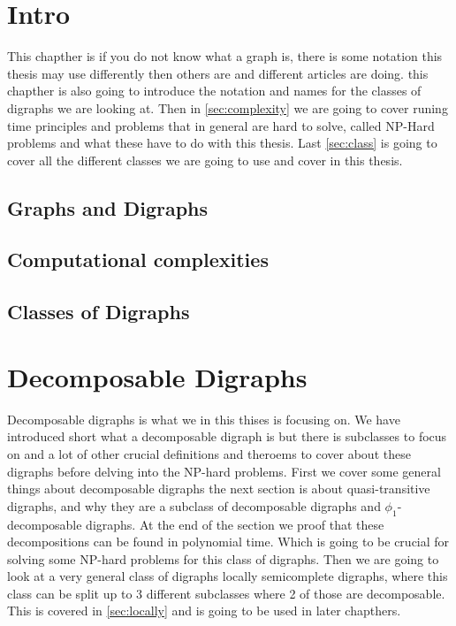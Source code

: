 
\chapter{Intro}
This chapther is if you do not know what a graph is, there is some notation this thesis may use differently then others are and different articles are doing. this chapther is also going to introduce the notation and names for the classes of digraphs we are looking at. Then in \autoref{sec:complexity} we are going to cover runing time principles and problems that in general are hard to solve, called NP-Hard problems and what these have to do with this thesis. Last \autoref{sec:class} is going to cover all the different classes we are going to use and cover in this thesis.
\label{chap:intro}
\section{Graphs and Digraphs}
\label{sec:digraph}

\section{Computational complexities}
\label{sec:complexity}
%
\section{Classes of Digraphs}
\label{sec:class}


\chapter{Decomposable Digraphs}
\label{chap:decomposable}
Decomposable digraphs is what we in this thises is focusing on. 
We have introduced short what a decomposable digraph is but there is subclasses to focus on and a lot of other crucial definitions and theroems to cover about these digraphs before delving into the NP-hard problems. First we cover some general things about decomposable digraphs the next section is about quasi-transitive digraphs, and why they are a subclass of decomposable digraphs and $\phi_1$-decomposable digraphs. At the end of the section we proof that these decompositions can be found in polynomial time. Which is going to be crucial for solving some NP-hard problems for this class of digraphs. Then we are going to look at a very general class of digraphs locally semicomplete digraphs, where this class can be split up to 3 different subclasses where 2 of those are decomposable. This is covered in \autoref{sec:locally} and is going to be used in later chapthers. 
